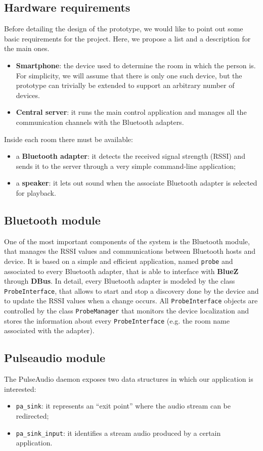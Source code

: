 \documentclass[conference]{IEEEtran}
\begin{document}
\subsection{Hardware requirements}
\label{hardware-requirements}
Before detailing the design of the prototype, we would like to point out some basic requirements for the project. Here, we propose a list and a description for the main ones.
\begin{itemize}
\item{\textbf{Smartphone}:} the device used to determine the room in which the person is. For simplicity, we will assume that there is only one such device, but the prototype can trivially be extended to support an arbitrary number of devices.
\item{\textbf{Central server}:} it runs the main control application and manages all the communication channels with the Bluetooth adapters.
\end{itemize}
Inside each room there must be available:
\begin{itemize}
\item{a \textbf{Bluetooth adapter}:} it detects the received signal strength (RSSI) and sends it to the server through a very simple command-line application;
\item{a \textbf{speaker}:} it lets out sound when the associate Bluetooth adapter is selected for playback.
\end{itemize}

\subsection{Bluetooth module}
One of the most important components of the system is the Bluetooth module, that manages the RSSI values and communications between Bluetooth hosts and device. It is based on a simple and efficient application, named \texttt{probe} and associated to every Bluetooth adapter, that is able to interface with \textbf{BlueZ} through \textbf{DBus}. In detail, every Bluetooth adapter is modeled by the class \texttt{ProbeInterface}, that allows to start and stop a discovery done by the device and to update the RSSI values when a change occurs. All \texttt{ProbeInterface} objects are controlled by the class \texttt{ProbeManager} that monitors the device localization and stores the information about every \texttt{ProbeInterface} (e.g. the room name associated with the adapter).

\subsection{Pulseaudio module}
The PulseAudio daemon exposes two data structures in which our application is interested:
\begin{itemize}
\item \texttt{pa\_sink}: it represents an ``exit point'' where the audio stream can be redirected;
\item \texttt{pa\_sink\_input}: it identifies a stream audio produced by a certain application.
\end{itemize}
\end{document}
